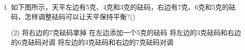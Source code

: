 \documentclass[10pt, a4paper]{article}
\begin{document}
\begin{enumerate}
        
        \item 如下图所示，天平左边有5克、4克和3克的砝码，右边有7克、6克和5克的砝码，怎样调整砝码可以让天平保持平衡?(\qquad)
        \begin{tasks}(2)
            \task 将右边的7克砝码拿掉
            \task 在左边添加一个5克的砝码
            \task 将左边的3克砝码和右边的6克砝码对调
            \task 将左边的3克砝码和右边的7克砝码对调
        \end{tasks}
    \end{enumerate}
\end{document}
